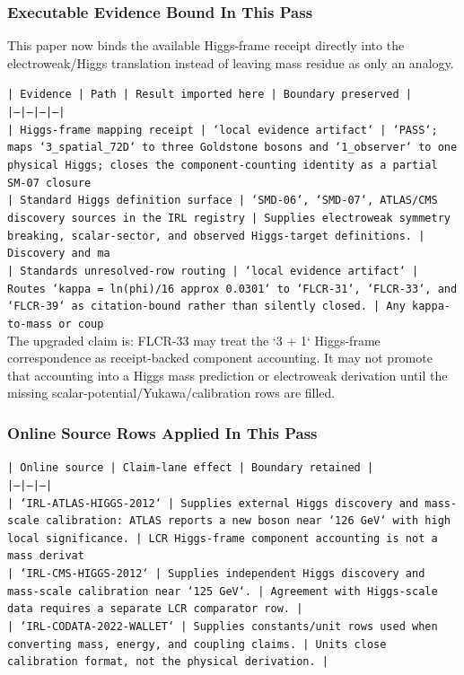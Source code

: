 \documentclass[11pt]{article}
\begin{document}
\subsubsection*{Executable Evidence Bound In This Pass}

This paper now binds the available Higgs-frame receipt directly into the electroweak/Higgs translation instead of leaving mass residue as only an analogy.

\noindent\texttt{| Evidence | Path | Result imported here | Boundary preserved |}\\
\noindent\texttt{|---|---|---|---|}\\
\noindent\texttt{| Higgs-frame mapping receipt | `local evidence artifact` | `PASS`; maps `3\_spatial\_72D` to three Goldstone bosons and `1\_observer` to one physical Higgs; closes the component-counting identity as a partial SM-07 closure}\\
\noindent\texttt{| Standard Higgs definition surface | `SMD-06`, `SMD-07`, ATLAS/CMS discovery sources in the IRL registry | Supplies electroweak symmetry breaking, scalar-sector, and observed Higgs-target definitions. | Discovery and ma}\\
\noindent\texttt{| Standards unresolved-row routing | `local evidence artifact` | Routes `kappa = ln(phi)/16 approx 0.0301` to `FLCR-31`, `FLCR-33`, and `FLCR-39` as citation-bound rather than silently closed. | Any kappa-to-mass or coup}\\

The upgraded claim is: FLCR-33 may treat the `3 + 1` Higgs-frame correspondence as receipt-backed component accounting. It may not promote that accounting into a Higgs mass prediction or electroweak derivation until the missing scalar-potential/Yukawa/calibration rows are filled.

\subsubsection*{Online Source Rows Applied In This Pass}

\noindent\texttt{| Online source | Claim-lane effect | Boundary retained |}\\
\noindent\texttt{|---|---|---|}\\
\noindent\texttt{| `IRL-ATLAS-HIGGS-2012` | Supplies external Higgs discovery and mass-scale calibration: ATLAS reports a new boson near `126 GeV` with high local significance. | LCR Higgs-frame component accounting is not a mass derivat}\\
\noindent\texttt{| `IRL-CMS-HIGGS-2012` | Supplies independent Higgs discovery and mass-scale calibration near `125 GeV`. | Agreement with Higgs-scale data requires a separate LCR comparator row. |}\\
\noindent\texttt{| `IRL-CODATA-2022-WALLET` | Supplies constants/unit rows used when converting mass, energy, and coupling claims. | Units close calibration format, not the physical derivation. |}\\
\end{document}
